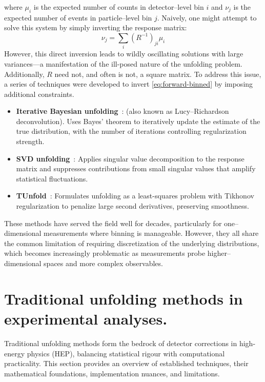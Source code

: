     where \(\mu_{i}\) is the expected number of counts in detector--level bin \(i\) and \(\nu_{j}\) is the expected number of events in particle--level bin $j$.
    Naively, one might attempt to solve this system by simply inverting the response matrix:
    \begin{equation}
        \nu_j = \sum_i (R^{-1})_{ji} \mu_i
    \end{equation}
    However, this direct inversion leads to wildly oscillating solutions with large variances---a manifestation of the ill-posed nature of the unfolding problem.
    Additionally, \(R\) need not, and often is not, a square matrix.
    To address this issue, a series of techniques were developed to invert \cref{eq:forward-binned} by imposing additional constraints.
    \begin{itemize}
    \item \textbf{Iterative Bayesian unfolding}~\cite{richardson_bayesian-based_1972, lucy_iterative_1974, Schmitt2017DataPhysics}: (also known as Lucy--Richardson deconvolution). Uses Bayes' theorem to iteratively update the estimate of the true distribution, with the number of iterations controlling regularization strength.
    \item \textbf{SVD unfolding}~\cite{hocker_svd_1996}: Applies singular value decomposition to the response matrix and suppresses contributions from small singular values that amplify statistical fluctuations.
    \item \textbf{TUnfold}~\cite{schmitt_tunfold_2012}: Formulates unfolding as a least-squares problem with Tikhonov regularization to penalize large second derivatives, preserving smoothness.
    \end{itemize}

These methods have served the field well for decades, particularly for one--dimensional measurements where binning is manageable.
%
However, they all share the common limitation of requiring discretization of the underlying distributions, which becomes increasingly problematic as measurements probe higher--dimensional spaces and more complex observables.


\section{Traditional unfolding methods in experimental analyses.}
\label{sec:binned-methods}
Traditional unfolding methods form the bedrock of detector corrections in high-energy physics (HEP), balancing statistical rigour with computational practicality.
%
This section provides an overview of established techniques, their mathematical foundations, implementation nuances, and limitations.

